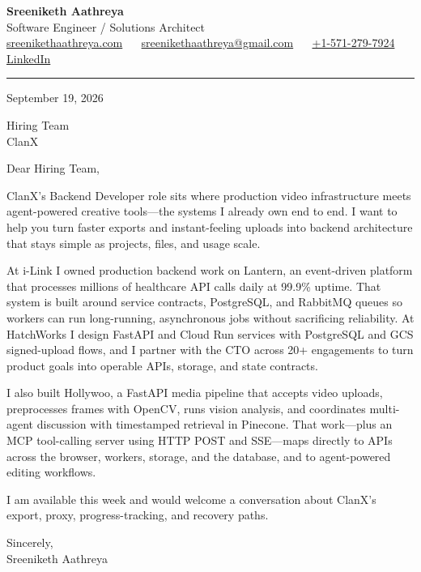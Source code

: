 \documentclass[11pt, letterpaper]{article}
\begin{document}
{\fontsize{18 pt}{20 pt}\selectfont\bfseries Sreeniketh Aathreya}\\[4pt]
Software Engineer / Solutions Architect\\[6pt]
\href{https://sreenikethaathreya.com}{sreenikethaathreya.com}
~\textbullet~
\href{mailto:sreenikethaathreya@gmail.com}{sreenikethaathreya@gmail.com}
~\textbullet~
\href{tel:+1-571-279-7924}{+1-571-279-7924}
~\textbullet~
\href{https://www.linkedin.com/in/sreeniketh-aathreya-16800b122/}{LinkedIn}

\vspace{12pt}
\hrule
\vspace{12pt}

September 19, 2026

\vspace{8pt}

Hiring Team\\
ClanX

\vspace{12pt}

Dear Hiring Team,

ClanX's Backend Developer role sits where production video infrastructure meets agent-powered creative tools---the systems I already own end to end. I want to help you turn faster exports and instant-feeling uploads into backend architecture that stays simple as projects, files, and usage scale.

At i-Link I owned production backend work on Lantern, an event-driven platform that processes millions of healthcare API calls daily at 99.9\% uptime. That system is built around service contracts, PostgreSQL, and RabbitMQ queues so workers can run long-running, asynchronous jobs without sacrificing reliability. At HatchWorks I design FastAPI and Cloud Run services with PostgreSQL and GCS signed-upload flows, and I partner with the CTO across 20+ engagements to turn product goals into operable APIs, storage, and state contracts.

I also built Hollywoo, a FastAPI media pipeline that accepts video uploads, preprocesses frames with OpenCV, runs vision analysis, and coordinates multi-agent discussion with timestamped retrieval in Pinecone. That work---plus an MCP tool-calling server using HTTP POST and SSE---maps directly to APIs across the browser, workers, storage, and the database, and to agent-powered editing workflows.

I am available this week and would welcome a conversation about ClanX's export, proxy, progress-tracking, and recovery paths.

Sincerely,\\[12pt]
Sreeniketh Aathreya
\end{document}
